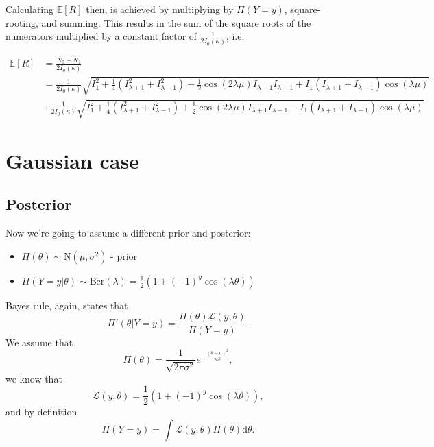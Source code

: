 \documentclass[]{report}
\begin{document}
Calculating $\mathbb{E}[R]$ then, is achieved by multiplying by  $\Pi(Y = y)$, square-rooting, and summing. This results in the sum of the square roots of the numerators multiplied by a constant factor of $\frac{1}{2 I_0(\kappa)}$, i.e.

\begin{align*}
	\mathbb{E}[R] &= \frac{N_0 + N_1}{2 I_0(\kappa)} \\
		      &= \frac{1}{2 I_0(\kappa) } \sqrt{I_1^2 + \frac{1}{4} \left( I_{\lambda + 1}^{2} + I_{\lambda - 1}^2 \right)  + \frac{1}{2}\cos(2 \lambda \mu) I_{\lambda +1} I_{\lambda - 1} + I_1 \left( I_{\lambda + 1} + I_{\lambda -1 } \right) \cos (\lambda \mu) } \\
		      & + \frac{1}{2 I_0(\kappa) } \sqrt{I_1^2 + \frac{1}{4} \left( I_{\lambda + 1}^{2} + I_{\lambda - 1}^2 \right)  + \frac{1}{2}\cos(2 \lambda \mu) I_{\lambda +1} I_{\lambda - 1} - I_1 \left( I_{\lambda + 1} + I_{\lambda -1 } \right) \cos (\lambda \mu) }
\end{align*}

\section{Gaussian case}
\subsection{Posterior}
Now we're going to assume a different prior and posterior:

\begin{itemize}
	\item $\Pi(\theta) \sim \text{N}(\mu, \sigma^2)$ - prior
	\item $\Pi(Y=y | \theta) \sim \text{Ber}(\lambda) = \frac{1}{2}(1 + (-1)^{y} \cos(\lambda \theta))$
\end{itemize}
Bayes rule, again, states that
\begin{equation}
    \Pi'(\theta|Y = y) = \frac{\Pi(\theta) \mathcal{L} (y, \theta)}{\Pi(Y=y)}.
\end{equation}
We assume that
\begin{equation}
    \Pi(\theta) = \frac{1}{\sqrt{2\pi \sigma^2}} e^{-\frac{(\theta - \mu)^2}{2\sigma^2}},
\end{equation}
we know that
\begin{equation}
    \mathcal{L} (y, \theta) = \frac{1}{2}(1 + (-1)^{y} \cos(\lambda \theta)),
\end{equation}
and by definition
\begin{equation}
\label{eq:normalisation-factor}
    \Pi(Y=y) = \int \mathcal{L}(y, \theta) \Pi(\theta) \text{d}\theta.
\end{equation}
\end{document}
